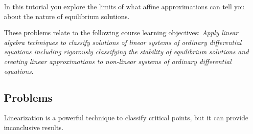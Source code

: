 \begin{objectives}
	In this tutorial you explore the limits of what affine approximations can
	tell you about the nature of equilibrium solutions.

	These problems relate to the following course learning objectives:
	\textit{Apply linear algebra techniques to classify solutions of linear systems of ordinary differential
		equations including rigorously classifying the stability of equilibrium solutions and creating
		linear approximations to non-linear systems of ordinary differential equations}.
\end{objectives}

\subsection*{Problems}

Linearization is a powerful technique to classify critical points, but it can provide inconclusive results.

